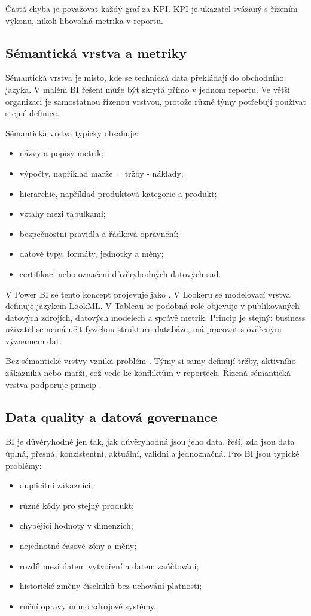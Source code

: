 Častá chyba je považovat každý graf za KPI. KPI je ukazatel svázaný s řízením výkonu, nikoli libovolná metrika v reportu.

\subsection{Sémantická vrstva a metriky}
Sémantická vrstva je místo, kde se technická data překládají do obchodního jazyka. V malém BI řešení může být skrytá přímo v jednom reportu. Ve větší organizaci je samostatnou řízenou vrstvou, protože různé týmy potřebují používat stejné definice.

Sémantická vrstva typicky obsahuje:
\begin{itemize}
  \item názvy a popisy metrik;
  \item výpočty, například marže = tržby - náklady;
  \item hierarchie, například produktová kategorie a produkt;
  \item vztahy mezi tabulkami;
  \item bezpečnostní pravidla a řádková oprávnění;
  \item datové typy, formáty, jednotky a měny;
  \item certifikaci nebo označení důvěryhodných datových sad.
\end{itemize}

V Power BI se tento koncept projevuje jako . V Lookeru se modelovací vrstva definuje jazykem LookML. V Tableau se podobná role objevuje v publikovaných datových zdrojích, datových modelech a správě metrik. Princip je stejný: business uživatel se nemá učit fyzickou strukturu databáze, má pracovat s ověřeným významem dat.

Bez sémantické vrstvy vzniká problém . Týmy si samy definují tržby, aktivního zákazníka nebo marži, což vede ke konfliktům v reportech. Řízená sémantická vrstva podporuje princip .

\subsection{Data quality a datová governance}
BI je důvěryhodné jen tak, jak důvěryhodná jsou jeho data.  řeší, zda jsou data úplná, přesná, konzistentní, aktuální, validní a jednoznačná. Pro BI jsou typické problémy:
\begin{itemize}
  \item duplicitní zákazníci;
  \item různé kódy pro stejný produkt;
  \item chybějící hodnoty v dimenzích;
  \item nejednotné časové zóny a měny;
  \item rozdíl mezi datem vytvoření a datem zaúčtování;
  \item historické změny číselníků bez uchování platnosti;
  \item ruční opravy mimo zdrojové systémy.
\end{itemize}

